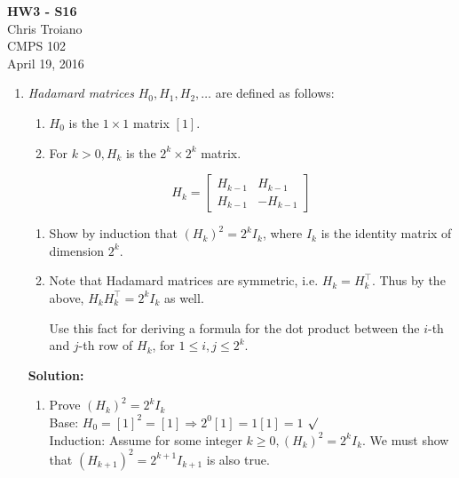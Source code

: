 \documentclass[11pt]{article}
\begin{document}
\vspace*{-2.1cm}
\begin{center}
{\bf\large HW3 - S16}\\
Chris Troiano\\
CMPS 102 \\
April 19, 2016
\end{center}

\begin{enumerate}
\item
\textit{Hadamard matrices} $H_0, H_1, H_2,
\ldots$ are defined as follows:
\begin{enumerate} 
\item $H_0$ is the $1 \times 1$ matrix $[1]$.
\item For $k>0, H_k$ is the $2^k \times 2^k$ matrix.
\end{enumerate}
\begin{displaymath}
H_k =
\begin{bmatrix}
H_{k-1} & H_{k-1} \\
H_{k-1} & -H_{k-1} 
\end{bmatrix}
\end{displaymath}

\begin{enumerate}
\item
Show by induction that $(H_k)^2=2^k I_k$, where
$I_k$ is the identity matrix of dimension $2^k$.
\item
Note that Hadamard matrices are symmetric, i.e.  $H_k=H_k^\top$. 
Thus by the above, $H_k H_k^\top = 2^k I_k$ as well. 

Use this fact for deriving a formula for the dot product
between the $i$-th and $j$-th row of $H_k$, for $1\le i,j\le 2^k$.
\end{enumerate}

\textbf{Solution:}\\
\begin{enumerate}
\item
Prove $(H_k)^2 = 2^kI_k$\\
Base: $H_0 = [1]^2 = [1] \Rightarrow 2^0[1] = 1[1] = 1$ $\surd$ \\
Induction: Assume for some integer $k \geq 0, (H_k)^2 = 2^kI_k$. We must show that $(H_{k+1})^2 = 2^{k+1}I_{k+1}$ is also true. \\


\end{enumerate}
\end{enumerate}
\end{document}
